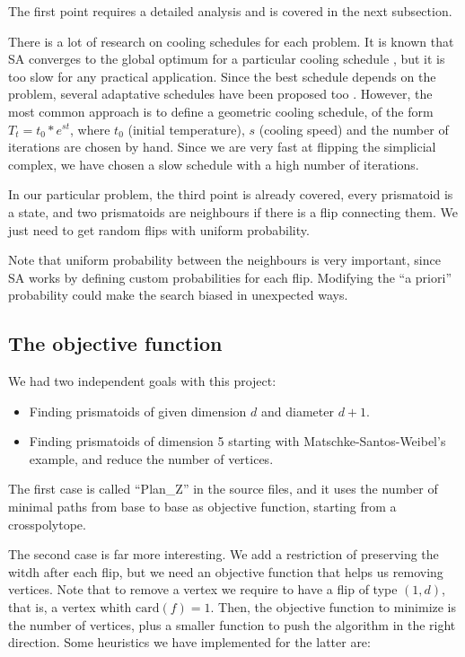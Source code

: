 \documentclass[12pt,a4paper]{article}
\theoremstyle{plain}
\theoremstyle{definition}
\begin{document}
The first point requires a detailed analysis and is covered in the next subsection.

There is a lot of research on cooling schedules for each problem. It is known that SA converges to the global optimum for a particular cooling schedule \cite{optimumSA}, but it is too slow for any practical application. Since the best schedule depends on the problem, several adaptative schedules have been proposed too \cite{adaptativeSA}. However, the most common approach is to define a geometric cooling schedule, of the form $T_t=t_0*e^{st}$, where $t_0$ (initial temperature), $s$ (cooling speed) and the number of iterations are chosen by hand. Since we are very fast at flipping the simplicial complex, we have chosen a slow schedule with a high number of iterations.

In our particular problem, the third point is already covered, every prismatoid is a state, and two prismatoids are neighbours if there is a flip connecting them. We just need to get random flips with uniform probability.

Note that uniform probability between the neighbours is very important, since SA works by defining custom probabilities for each flip. Modifying the ``a priori'' probability could make the search biased in unexpected ways.

\subsection{The objective function}

We had two independent goals with this project:

\begin{itemize}
  \item Finding prismatoids of given dimension $d$ and diameter $d+1$.
  \item Finding prismatoids of dimension 5 starting with Matschke-Santos-Weibel's example, and reduce the number of vertices.
\end{itemize}

The first case is called ``Plan\_Z'' in the source files, and it uses the number of minimal paths from base to base as objective function, starting from a crosspolytope.

The second case is far more interesting. We add a restriction of preserving the witdh after each flip, but we need an objective function that helps us removing vertices. Note that to remove a vertex we require to have a flip of type $(1,d)$, that is, a vertex whith $\text{card}(f)=1$. 
Then, the objective function to minimize is the number of vertices, plus a smaller function to push the algorithm in the right direction. Some heuristics we have implemented for the latter are:
\end{document}
